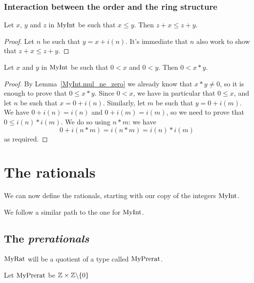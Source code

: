\subsection{Interaction between the order and the ring structure}

\begin{lemma}
    \label{MyInt.add_le_add_left}
    \leanok
    Let $x$, $y$ and $z$ in $\mathrm{MyInt}$ be such that $x \leq y$. Then $z + x ≤ z + y$.
\end{lemma}
\begin{proof}
    \leanok
    Let $n$ be such that $y = x + i(n)$. It's immediate that $n$ also work to show that $z + x ≤ z + y$.
\end{proof}

\begin{lemma}
    \label{MyInt.mul_pos}
    \leanok
    Let $x$ and $y$ in $\mathrm{MyInt}$ be such that $0 < x$ and $0 < y$. Then $0 < x * y$.
\end{lemma}
\begin{proof}
    \leanok
    By Lemma~\ref{MyInt.mul_ne_zero} we already know that $x*y \neq 0$, so it is enough to prove that
    $0 \leq x*y$. Since $0 < x$, we have in particular that $0 \leq x$, and let $n$ be such that $x = 0 + i(n)$. Similarly, let $m$ be such that $y = 0 + i(m)$. We have $0 + i(n) = i(n)$ and $0 + i(m) = i(m)$, so we need to prove that $0 \leq i(n)*i(m)$. We do so using $n*m$: we have
    \[
    0+i(n*m)=i(n*m)=i(n)*i(m)
    \]
    as required.
\end{proof}

\chapter{The rationals}

We can now define the rationals, starting with our copy of the integers $\mathrm{MyInt}$.

We follow a similar path to the one for $\mathrm{MyInt}$.

\section{The \emph{prerationals}}

$\mathrm{MyRat}$ will be a quotient of a type called $\mathrm{MyPrerat}$.

\begin{definition}
    \label{MyPrerat}
    \leanok
    Let $\mathrm{MyPrerat}$ be $\mathbb{Z} \times \mathbb{Z} \backslash \{0\}$
\end{definition}

